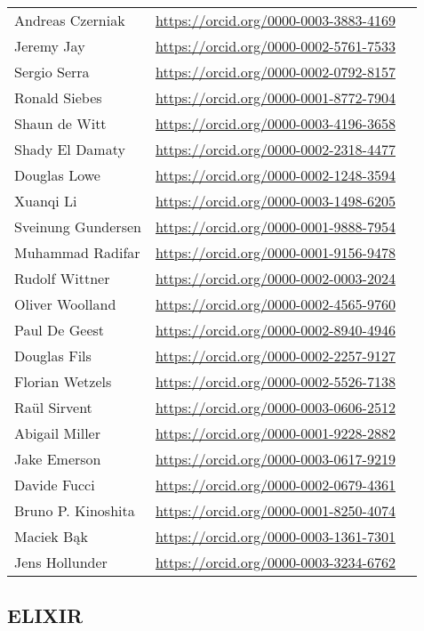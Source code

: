 \begin{longtable}{lll}
  Andreas Czerniak & \url{https://orcid.org/0000-0003-3883-4169}
\\
  Jeremy Jay & \url{https://orcid.org/0000-0002-5761-7533}
\\
  Sergio Serra & \url{https://orcid.org/0000-0002-0792-8157}
\\
  Ronald Siebes & \url{https://orcid.org/0000-0001-8772-7904}
\\
  Shaun de Witt & \url{https://orcid.org/0000-0003-4196-3658}
\\
  Shady El Damaty & \url{https://orcid.org/0000-0002-2318-4477}
\\
  Douglas Lowe & \url{https://orcid.org/0000-0002-1248-3594}
\\
  Xuanqi Li & \url{https://orcid.org/0000-0003-1498-6205}
\\
  Sveinung Gundersen & \url{https://orcid.org/0000-0001-9888-7954}
\\
  Muhammad Radifar & \url{https://orcid.org/0000-0001-9156-9478}
\\
  Rudolf Wittner & \url{https://orcid.org/0000-0002-0003-2024}
\\
  Oliver Woolland & \url{https://orcid.org/0000-0002-4565-9760}
\\
  Paul De Geest & \url{https://orcid.org/0000-0002-8940-4946}
\\
  Douglas Fils & \url{https://orcid.org/0000-0002-2257-9127}
\\
  Florian Wetzels & \url{https://orcid.org/0000-0002-5526-7138}
\\
  Raül Sirvent & \url{https://orcid.org/0000-0003-0606-2512}
\\
  Abigail Miller & \url{https://orcid.org/0000-0001-9228-2882}
\\
  Jake Emerson & \url{https://orcid.org/0000-0003-0617-9219}
\\
  Davide Fucci & \url{https://orcid.org/0000-0002-0679-4361}
\\
  Bruno P. Kinoshita & \url{https://orcid.org/0000-0001-8250-4074}
\\
  Maciek Bąk & \url{https://orcid.org/0000-0003-1361-7301}  
\\
  Jens Hollunder & \url{https://orcid.org/0000-0003-3234-6762}
\end{longtable}


\subsection{ELIXIR}

